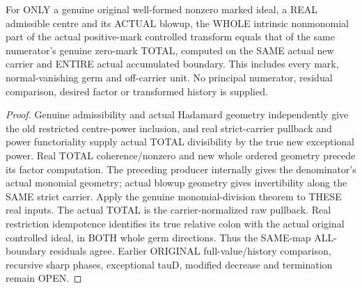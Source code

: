 \begin{theorem}
\label{hir:sharp-actual-controlled-total-whole-nonmonomial-comparison}
\leanok
For ONLY a genuine original well-formed nonzero marked ideal, a REAL
admissible centre and its ACTUAL blowup, the WHOLE intrinsic nonmonomial
part of the actual positive-mark controlled transform equals that of the
same numerator's genuine zero-mark TOTAL, computed on the SAME actual
new carrier and ENTIRE actual accumulated boundary. This includes every
mark, normal-vanishing germ and off-carrier unit. No principal numerator,
residual comparison, desired factor or transformed history is supplied.
\end{theorem}
\begin{proof}
Genuine admissibility and actual Hadamard geometry independently give the
old restricted centre-power inclusion, and real strict-carrier pullback
and power functoriality supply actual TOTAL divisibility by the true new
exceptional power. Real TOTAL coherence/nonzero and new whole ordered
geometry precede its factor computation. The preceding producer internally
gives the denominator's actual monomial geometry; actual blowup geometry
gives invertibility along the SAME strict carrier. Apply the genuine
monomial-division theorem to THESE real inputs. The actual TOTAL is the
carrier-normalized raw pullback. Real restriction idempotence identifies
its true relative colon with the actual original controlled ideal, in
BOTH whole germ directions. Thus the SAME-map ALL-boundary residuals
agree. Earlier ORIGINAL full-value/history comparison, recursive sharp
phases, exceptional tauD, modified decrease and termination remain OPEN.
\end{proof}
